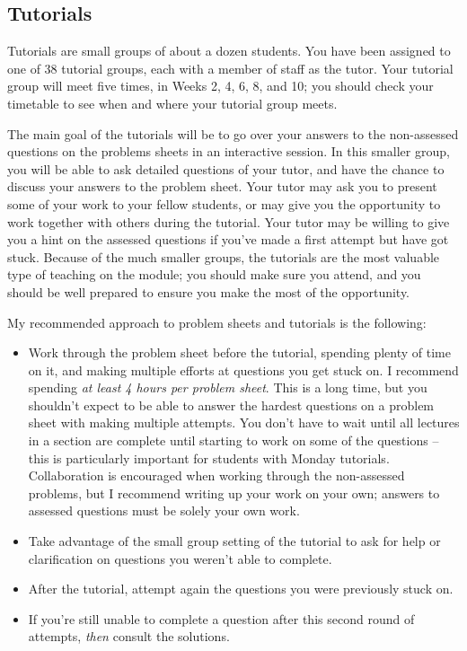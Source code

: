 \documentclass[
  a4paper,
]{book}
\providecommand{\tightlist}{%
  \setlength{\itemsep}{0pt}\setlength{\parskip}{0pt}}
\theoremstyle{definition}
\theoremstyle{definition}
\theoremstyle{definition}
\theoremstyle{definition}
\theoremstyle{remark}
\begin{document}
\hypertarget{tutorials}{%
\subsection*{Tutorials}\label{tutorials}}

Tutorials are small groups of about a dozen students. You have been assigned to one of 38 tutorial groups, each with a member of staff as the tutor. Your tutorial group will meet five times, in Weeks 2, 4, 6, 8, and 10; you should check your timetable to see when and where your tutorial group meets.

The main goal of the tutorials will be to go over your answers to the non-assessed questions on the problems sheets in an interactive session. In this smaller group, you will be able to ask detailed questions of your tutor, and have the chance to discuss your answers to the problem sheet. Your tutor may ask you to present some of your work to your fellow students, or may give you the opportunity to work together with others during the tutorial. Your tutor may be willing to give you a hint on the assessed questions if you've made a first attempt but have got stuck. Because of the much smaller groups, the tutorials are the most valuable type of teaching on the module; you should make sure you attend, and you should be well prepared to ensure you make the most of the opportunity.

My recommended approach to problem sheets and tutorials is the following:

\begin{itemize}
\tightlist
\item
  Work through the problem sheet before the tutorial, spending plenty of time on it, and making multiple efforts at questions you get stuck on. I recommend spending \emph{at least 4 hours per problem sheet}. This is a long time, but you shouldn't expect to be able to answer the hardest questions on a problem sheet with making multiple attempts. You don't have to wait until all lectures in a section are complete until starting to work on some of the questions -- this is particularly important for students with Monday tutorials. Collaboration is encouraged when working through the non-assessed problems, but I recommend writing up your work on your own; answers to assessed questions must be solely your own work.
\item
  Take advantage of the small group setting of the tutorial to ask for help or clarification on questions you weren't able to complete.
\item
  After the tutorial, attempt again the questions you were previously stuck on.
\item
  If you're still unable to complete a question after this second round of attempts, \emph{then} consult the solutions.
\end{itemize}
\end{document}
